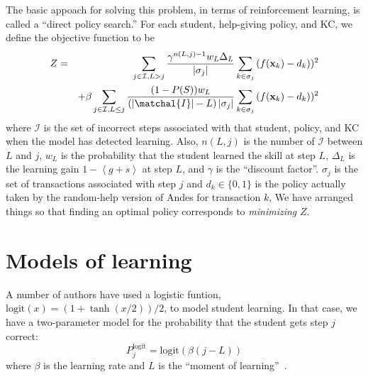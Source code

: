 \documentclass[11pt,letterpaper]{article}
\begin{document}
The basic appoach for solving this problem, in terms of reinforcement
learning, is called a ``direct policy search.''
For each student, help-giving policy, and KC, we define the objective 
function to be 
%
\begin{eqnarray}
  Z &=& \sum_{j \in \mathcal{I},L>j}  
       \frac{\gamma^{n(L,j)-1} w_L \Delta_L}{\left|\sigma_j\right|}
  \sum_{k\in \sigma_j} \left(f(\mathbf{x}_k)-d_k\right))^2 \nonumber \\
  &&+\beta \sum_{j \in \mathcal{I},L \le j} \frac{(1-P(S)) w_L}
      {\left(\left|\matchal{I}\right|-L\right)\left|\sigma_j\right|}
             \sum_{k\in \sigma_j} \left(f(\mathbf{x}_k)-d_k\right))^2
\end{eqnarray}
%
where  $\mathcal{I}$ is the set of incorrect steps associated
with that student, policy, and KC when the model has detected 
learning.  Also, $n(L,j)$ is the number
of $\mathcal{I}$ between $L$ and $j$, $w_L$ is the probability 
that the student learned the skill at step $L$, $\Delta_L$ is the learning
gain $1-\left\langle g+s \right\rangle$ at step $L$, and $\gamma$ 
is the ``discount factor''\cite{ml}.  
$\sigma_j$ is the set of transactions associated with step $j$ and
$d_k\in \{0,1\}$ is the
policy actually taken by the random-help version of Andes for transaction
$k$,
We have arranged things so that finding an optimal policy 
corresponds to {\em minimizing} $Z$.


\section{Models of learning}

A number of authors have used a logistic funtion, 
$\mathrm{logit}(x)=(1+\tanh(x/2))/2$, to 
model student learning.  In that case, we have a two-parameter
model for the probability that the student gets step $j$ correct:
%
\begin{equation}
               P_j^\mathrm{logit} = \mathrm{logit}\left(\beta (j-L)\right)
\end{equation}
%
where $\beta$ is the learning rate and $L$ is the ``moment
of learning''~\cite{aha}.
\end{document}

